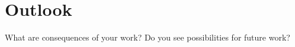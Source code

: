 \chapter{Outlook}
\label{cha:outlook}

What are consequences of your work? Do you see possibilities for future work?